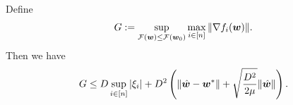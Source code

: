     
    \begin{lemma}
        Define 
        \[G := \sup_{\mathcal{F}({\bm{w}})\leq\mathcal{F}({\bm{w}}_0)}\max_{i\in [n]}\|\nabla f_i({\bm{w}})\|.\]
        Then we have
        \begin{align}
            G\leq D\sup_{i\in[n]}|\xi_i|+D^2\left(\|\hat{{\bm{w}}}-{\bm{w}}^*\|+\sqrt{\frac{D^2}{2\mu}}\|\hat{{\bm{w}}}\|\right). \label{ineq:G-bound}
        \end{align}
    \end{lemma}
